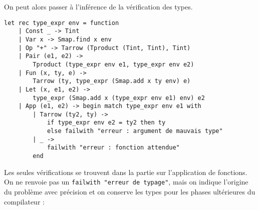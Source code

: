 \documentclass{cours}
\begin{document}
On peut alors passer à l'inférence de la vérification des types.
\begin{verbatim}
let rec type_expr env = function
    | Const _ -> Tint
    | Var x -> Smap.find x env
    | Op "+" -> Tarrow (Tproduct (Tint, Tint), Tint)
    | Pair (e1, e2) ->
        Tproduct (type_expr env e1, type_expr env e2)
    | Fun (x, ty, e) ->
        Tarrow (ty, type_expr (Smap.add x ty env) e)    
    | Let (x, e1, e2) ->
        type_expr (Smap.add x (type_expr env e1) env) e2
    | App (e1, e2) -> begin match type_expr env e1 with
        | Tarrow (ty2, ty) ->
            if type_expr env e2 = ty2 then ty
            else failwith "erreur : argument de mauvais type"
        | _ ->
            failwith "erreur : fonction attendue"
        end
\end{verbatim}

Les seules vérifications se trouvent dans la partie sur l'application de fonctions.\\
On ne renvoie pas un \texttt{failwith "erreur de typage"}, mais on indique l'origine du problème avec précision et on conserve les types pour les phases ultérieures du compilateur :
\end{document}
